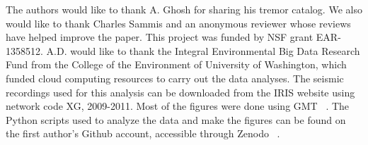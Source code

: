 \documentclass[draft]{agujournal2019}
\begin{document}
%
%

%

%




%
%
%
%
%
%
%
%


\acknowledgments
The authors would like to thank A. Ghosh for sharing his tremor catalog. We also would like to thank Charles Sammis and an anonymous reviewer whose reviews have helped improve the paper. This project was funded by NSF grant EAR-1358512. A.D. would like to thank the Integral Environmental Big Data Research Fund from the College of the Environment of University of Washington, which funded cloud computing resources to carry out the data analyses. The seismic recordings used for this analysis can be downloaded from the IRIS website using network code XG, 2009-2011. Most of the figures were done using GMT ~\cite{WES_1991}. The Python scripts used to analyze the data and make the figures can be found on the first author's Github account, accessible through Zenodo ~\cite{ariane_ducellier_2021_5725990}.
\end{document}
